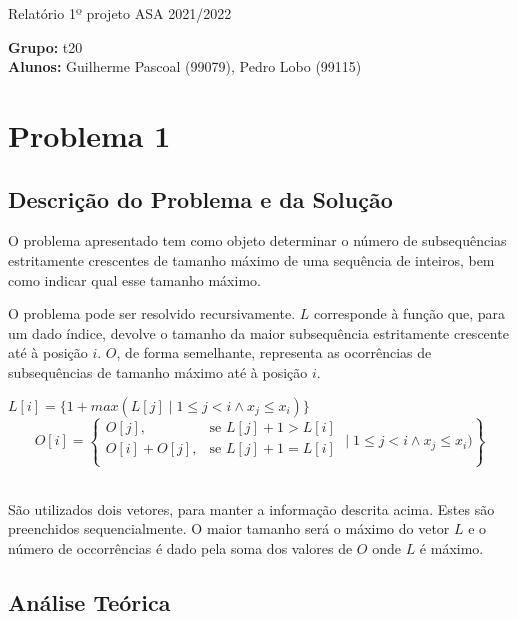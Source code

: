 \documentclass[12pt, letterpaper]{article}
\begin{document}
\begin{center}
	{\LARGE{Relatório 1º projeto ASA 2021/2022}}\\[\baselineskip]
\end{center}

\begin{flushleft}
	\textbf{Grupo:} t20\\
	\textbf{Alunos:} Guilherme Pascoal (99079), Pedro Lobo (99115)
\end{flushleft}


\section{Problema 1}
\subsection{Descrição do Problema e da Solução}

O problema apresentado tem como objeto determinar o número de subsequências
estritamente crescentes de tamanho máximo de uma sequência de inteiros, bem
como indicar qual esse tamanho máximo.

O problema pode ser resolvido recursivamente. $L$ corresponde à função que,
para um dado índice, devolve o tamanho da maior subsequência estritamente
crescente até à posição $i$. $O$, de forma semelhante, representa as ocorrências
de subsequências de tamanho máximo até à posição $i$.

\begin{center}
	${L[i] = \{1 + max(L[j] \mid 1 \leq j < i \land x_j \leq x_i)}\}$\\
	\[
    O[i] = \left\{\begin{array}{lr}
		O[j], & \text{se } L[j] + 1 > L[i]\\
		O[i] + O[j], & \text{se } L[j] + 1 = L[i]\\
        \end{array} \mid 1 \leq j < i \land x_j \leq x_i)\right\}
	\]\\[\baselineskip]

\end{center}

São utilizados dois vetores, para manter a informação descrita acima. Estes são
preenchidos sequencialmente. O maior tamanho será o máximo do vetor $L$ e o número
de occorrências é dado pela soma dos valores de $O$ onde $L$ é máximo.


\subsection{Análise Teórica}
\end{document}
